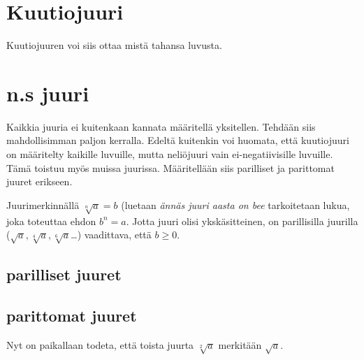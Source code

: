 \section{Kuutiojuuri}

Kuutiojuuren voi siis ottaa mistä tahansa luvusta.

\section{n.s juuri}
Kaikkia juuria ei kuitenkaan kannata määritellä yksitellen. Tehdään siis mahdollisimman paljon kerralla. Edeltä kuitenkin voi huomata, että kuutiojuuri on määritelty kaikille luvuille, mutta neliöjuuri vain ei-negatiivisille luvuille. Tämä toistuu myös muissa juurissa. Määritellään siis parilliset ja parittomat juuret erikseen.

Juurimerkinnällä $\sqrt[n]{a}=b$ (luetaan \emph{ännäs juuri aasta on bee} tarkoitetaan lukua, joka toteuttaa ehdon $b^n = a$. Jotta juuri olisi ykskäsitteinen, on parillisilla juurilla ($\sqrt{a}, \sqrt[4]{a}, \sqrt[6]{a}$\ldots) vaadittava, että $b\ge0$.

\subsection{parilliset juuret}


\subsection{parittomat juuret}

Nyt on paikallaan todeta, että toista juurta $\sqrt[2]{a}$ merkitään $\sqrt{a}$.

